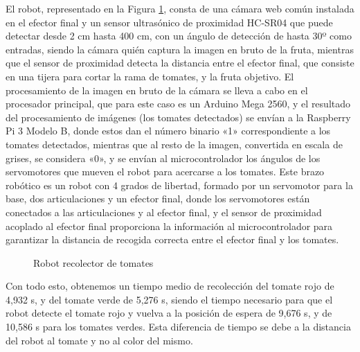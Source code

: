 El robot, representado en la Figura \ref{fig:Robots_tomates}, consta de una cámara web común instalada en el efector final y un sensor ultrasónico de proximidad HC-SR04 que puede detectar desde 2 cm hasta 400 cm, con un ángulo de detección de hasta 30º como entradas, siendo la cámara quién captura la imagen en bruto de la fruta, mientras que el sensor de proximidad detecta la distancia entre el efector final, que consiste en una tijera para cortar la rama de tomates, y la fruta objetivo. El procesamiento de la imagen en bruto de la cámara se lleva a cabo en el procesador principal, que para este caso es un Arduino Mega 2560, y el resultado del procesamiento de imágenes (los tomates detectados) se envían a la Raspberry Pi 3 Modelo B, donde estos dan el número binario «1» correspondiente a los tomates detectados, mientras que al resto de la imagen, convertida en escala de grises, se considera «0», y se envían al microcontrolador los ángulos de los servomotores que mueven el robot para acercarse a los tomates. Este brazo robótico es un robot con 4 grados de libertad, formado por un servomotor para la base, dos articulaciones y un efector final, donde los servomotores están conectados a las articulaciones y al efector final, y el sensor de proximidad acoplado al efector final proporciona la información al microcontrolador para garantizar la distancia de recogida correcta entre el efector final y los tomates.\\

\begin{figure}[H]
    \begin{center}
      \subcapcentertrue
      \hspace{2mm}
    \end{center}
    \caption{Robot recolector de tomates}
    \label{fig:Robots_tomates}
\end{figure}

Con todo esto, obtenemos un tiempo medio de recolección del tomate rojo de 4,932 s, y del tomate verde de 5,276 s, siendo el tiempo necesario para que el robot detecte el tomate rojo y vuelva a la posición de espera de 9,676 s, y de 10,586 s para los tomates verdes. Esta diferencia de tiempo se debe a la distancia del robot al tomate y no al color del mismo.








